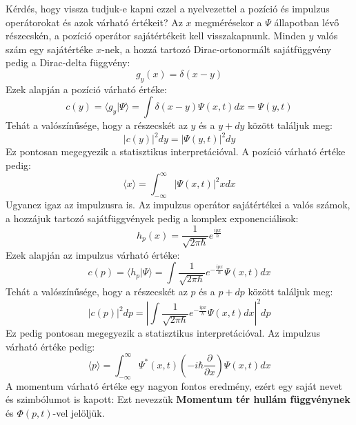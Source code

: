 \documentclass[../main.tex]{subfiles}
\begin{document}
Kérdés, hogy vissza tudjuk-e kapni ezzel a nyelvezettel a pozíció és impulzus operátorokat és azok várható értékeit? 
Az $x$ megmérésekor a $\Psi$ állapotban lévő részecskén, a pozíció operátor sajátértékeit kell visszakapnunk. Minden $y$ valós szám egy sajátértéke $x$-nek, a hozzá tartozó Dirac-ortonormált sajátfüggvény pedig a Dirac-delta függvény:
\begin{equation}
    g_y (x) = \delta(x - y)
\end{equation}
Ezek alapján a pozíció várható értéke:
\begin{equation}
    c(y) = \langle g_y | \Psi \rangle = \int \delta(x - y) \Psi(x,t) dx = \Psi(y,t)
\end{equation}
Tehát a valószínűsége, hogy a részecskét az $y$ és a $y + dy$ között találjuk meg:
\begin{equation}
    |c(y)|^2 dy = |\Psi(y,t)|^2 dy
\end{equation}
Ez pontosan megegyezik a statisztikus interpretációval. A pozíció várható értéke pedig:
\begin{equation}
    \langle x \rangle = \int_{-\infty}^{\infty} |\Psi(x,t)|^2 x dx
\end{equation}
Ugyanez igaz az impulzusra is. Az impulzus operátor sajátértékei a valós számok, a hozzájuk tartozó sajátfüggvények pedig a komplex exponenciálisok:
\begin{equation}
    h_p (x) = \frac{1}{\sqrt{2 \pi \hbar}} e^{\frac{i p x}{\hbar}}
\end{equation}
Ezek alapján az impulzus várható értéke:
\begin{equation}
    c(p) = \langle h_p | \Psi \rangle = \int \frac{1}{\sqrt{2 \pi \hbar}} e^{-\frac{i p x}{\hbar}} \Psi(x,t) dx
\end{equation}
Tehát a valószínűsége, hogy a részecskét az $p$ és a $p + dp$ között találjuk meg:
\begin{equation}
    |c(p)|^2 dp = \left| \int \frac{1}{\sqrt{2 \pi \hbar}} e^{-\frac{i p x}{\hbar}} \Psi(x,t) dx \right|^2 dp
\end{equation}
Ez pedig pontosan megegyezik a statisztikus interpretációval. Az impulzus várható értéke pedig:
\begin{equation}
    \langle p \rangle = \int_{-\infty}^{\infty} \Psi^*(x,t) \left(-i \hbar \frac{\partial}{\partial x}\right) \Psi(x,t) dx
\end{equation}
A momentum várható értéke egy nagyon fontos eredmény, ezért egy saját nevet és szimbólumot is kapott: Ezt nevezzük \textbf{Momentum tér hullám függvénynek} és $\Phi(p,t)$-vel jelöljük.
\end{document}
